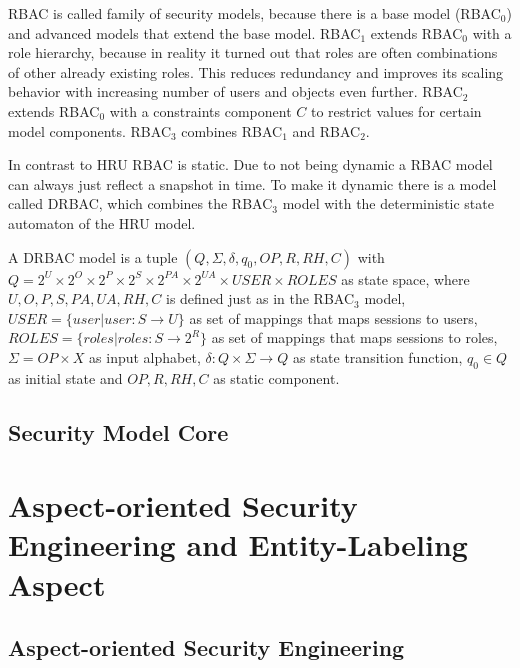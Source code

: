 \documentclass[twoside, openright, 12pt]{book}
\begin{document}
RBAC is called family of security models, because there is a base model (RBAC$_0$) and advanced models that extend the base model.
RBAC$_1$ extends RBAC$_0$ with a role hierarchy, because in reality it turned out that roles are often combinations of other already existing roles.
This reduces redundancy and improves its scaling behavior with increasing number of users and objects even further.
RBAC$_2$ extends RBAC$_0$ with a constraints component $C$ to restrict values for certain model components.
RBAC$_3$ combines RBAC$_1$ and RBAC$_2$.

In contrast to HRU RBAC is static.
Due to not being dynamic a RBAC model can always just reflect a snapshot in time.
To make it dynamic there is a model called DRBAC, which combines the RBAC$_3$ model with the deterministic state automaton of the HRU model.

\begin{xdefinition}[DRBAC] 
A DRBAC model is a tuple 
$(Q, \Sigma , \delta , q_{0}, OP, R, RH, C)$ with
$Q = 2^U \times 2^O \times 2^P \times 2^S \times 2^{\mathit{PA}} \times 2^{\mathit{UA}} \times \mathit{USER} \times \mathit{ROLES}$ as state space, where $U, O, P, S, PA, UA, RH, C$ is defined just as in the RBAC$_3$ model, 
$\mathit{USER} = \lbrace user|user: S \rightarrow U \rbrace$ as set of mappings that maps sessions to users, 
$\mathit{ROLES} = \lbrace roles|roles: S \rightarrow 2^R \rbrace$ as set of mappings that maps sessions to roles, 
$\Sigma = OP \times X$ as input alphabet, 
$\delta : Q \times \Sigma \rightarrow Q$ as state transition function, 
$q_0 \in Q$ as initial state and 
$OP, R, RH, C$ as static component.
\end{xdefinition}



\subsection{Security Model Core}
\label{model_core}



\section{Aspect-oriented Security Engineering and Entity-Labeling Aspect}
\label{AOSEEL}


\subsection{Aspect-oriented Security Engineering}
\label{AOSE}
\end{document}
